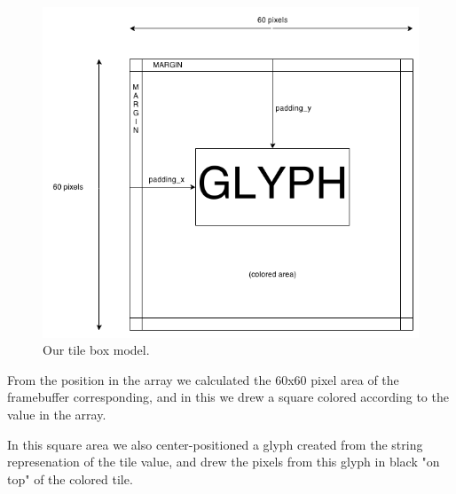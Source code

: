 \begin{figure}[h!]
    \centering
    \includegraphics[width=15cm]{img/boxmodel.png}
    \caption{Our tile box model.}
\end{figure}

From the position in the array we calculated the 60x60 pixel area of the framebuffer corresponding, and in this we drew a square colored according to the value in the array.

In this square area we also center-positioned a glyph created from the string represenation of the tile value,
and drew the pixels from this glyph in black "on top" of the colored tile.


